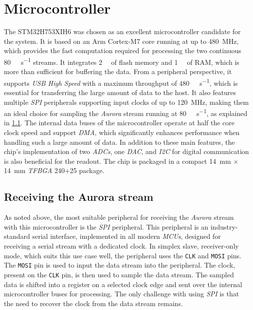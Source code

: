 \section{Microcontroller}
The STM32H753XIH6 was chosen as an excellent microcontroller candidate for the system. It is based on an Arm Cortex-M7 core running at up to \SI{480}{\mega\hertz}, which provides the fast computation required for processing the two continuous \SI{80}{\mega\bit\per\second} streams. It integrates \SI{2}{\mega\byte} of flash memory and \SI{1}{\mega\byte} of RAM, which is more than sufficient for buffering the data. From a peripheral perspective, it supports \emph{USB High Speed} with a maximum throughput of \SI{480}{\mega\bit\per\second}, which is essential for transferring the large amount of data to the host. It also features multiple \emph{SPI} peripherals supporting input clocks of up to \SI{120}{\mega\hertz}, making them an ideal choice for sampling the \emph{Aurora} stream running at \SI{80}{\mega\bit\per\second}, as explained in \ref{sec:aurora_sampling}. The internal data buses of the microcontroller operate at half the core clock speed and support \emph{DMA}, which significantly enhances performance when handling such a large amount of data. In addition to these main features, the chip's implementation of two \emph{ADCs}, one \emph{DAC}, and \emph{I2C} for digital communication is also beneficial for the readout. The chip is packaged in a compact \SI{14}{\milli\meter} $\times$ \SI{14}{\milli\meter} \emph{TFBGA} 240+25 package. \cite{stm32h753xih6_datasheet}

\subsection{Receiving the Aurora stream}
\label{sec:aurora_sampling}
As noted above, the most suitable peripheral for receiving the \emph{Aurora} stream with this microcontroller is the \emph{SPI} peripheral. This peripheral is an industry-standard serial interface, implemented in all modern \textit{MCUs}, designed for receiving a serial stream with a dedicated clock. In simplex slave, receiver-only mode, which suits this use case well, the peripheral uses the \verb|CLK| and \verb|MOSI| pins. The \verb|MOSI| pin is used to input the data stream into the peripheral. The clock, present on the \verb|CLK| pin, is then used to sample the data stream. The sampled data is shifted into a register on a selected clock edge and sent over the internal microcontroller buses for processing. \cite{stm32h753xih6_ref_manual} The only challenge with using \emph{SPI} is that the need to recover the clock from the data stream remains.

